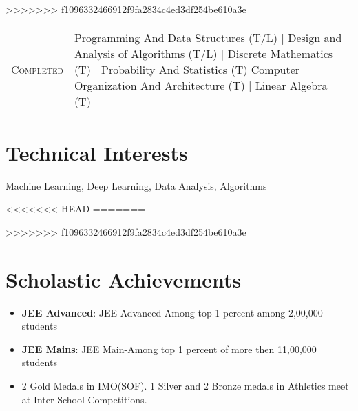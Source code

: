 \documentclass[a4paper,10pt]{extarticle} %
\begin{document}
>>>>>>> f1096332466912f9fa2834c4ed3df254be610a3e

\begin{tabular}{r|p{15cm}}
\textsc{Completed} & Programming And Data Structures (T/L) | Design and Analysis of Algorithms (T/L) | Discrete Mathematics (T) | Probability And Statistics (T) Computer Organization And Architecture (T) | Linear Algebra (T) \\
\end{tabular}
\vspace{0.4cm}






\vspace{-0.4cm}
\section{\textcolor{primary}{Technical Interests}}
\noindent Machine Learning, Deep Learning, Data Analysis,  Algorithms \\
\vspace{0.4cm}

<<<<<<< HEAD
=======

>>>>>>> f1096332466912f9fa2834c4ed3df254be610a3e



\vspace{-0.2cm}
\section{\textcolor{primary}{Scholastic Achievements}}

\begin{itemize}[leftmargin=0.55cm, rightmargin=0.2cm, label={\Large\textbullet}]

\item\textbf{JEE Advanced}: {JEE Advanced-Among top 1 percent among 2,00,000 students}
\item\textbf{JEE Mains}: {JEE Main-Among top 1 percent of more then 11,00,000 students}
\item\textbf{}2 Gold Medals in IMO(SOF). 1 Silver and 2 Bronze medals in Athletics meet at Inter-School Competitions. 
\end{itemize}
\vspace{0.4cm}
\end{document}
